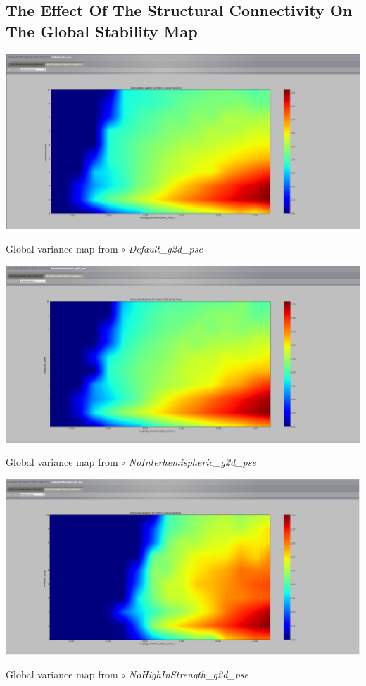 \documentclass{tufte-handout}
\begin{document}
\subsection{The Effect Of The Structural Connectivity On The Global Stability Map}
 \begin{marginfigure}%
  \includegraphics[width=\linewidth]{Handout_UI_ModellingStructuralLesions_DefaultPSE}
    \caption{Global variance map from $\circ$  \textit{Default\_g2d\_pse}}
  \label{fig:default_pse}
  \end{marginfigure}
 \begin{marginfigure}%
  \includegraphics[width=\linewidth]{Handout_UI_ModellingStructuralLesions_NoInterHemisphericPSE}
    \caption{Global variance map from $\circ$  \textit{NoInterhemispheric\_g2d\_pse}}
  \label{fig:nointer_pse}
  \end{marginfigure}
 \begin{marginfigure}%
  \includegraphics[width=\linewidth]{Handout_UI_ModellingStructuralLesions_NoHighInStrengthPSE}
    \caption{Global variance map from $\circ$  \textit{NoHighInStrength\_g2d\_pse} }
  \label{fig:nostrength_pse}
  \end{marginfigure}
\end{document}
